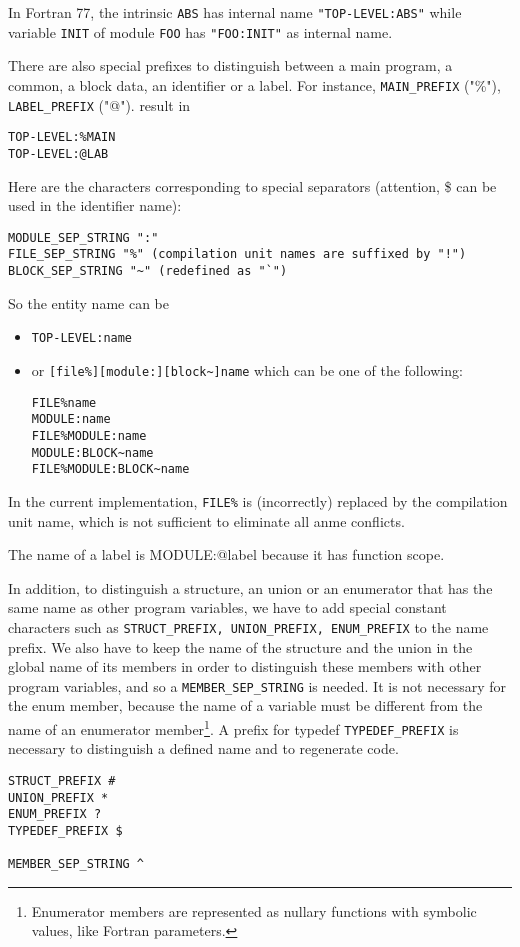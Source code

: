 \documentclass[a4paper]{report}
\begin{document}
In Fortran 77, the intrinsic \verb/ABS/ has internal name
\verb/"TOP-LEVEL:ABS"/ while variable \verb/INIT/ of module \verb/FOO/
has \verb/"FOO:INIT"/ as internal name.

There are also special prefixes to distinguish between a main program,
a common, a block data, an identifier or a label. For instance,
\verb/MAIN_PREFIX/ ("\%"), \verb/LABEL_PREFIX/ ("@"). result in
\begin{verbatim}
TOP-LEVEL:%MAIN
TOP-LEVEL:@LAB
\end{verbatim}

Here are the characters corresponding to special separators (attention, \$
can be used in the identifier name): 
\begin{verbatim}
MODULE_SEP_STRING ":"
FILE_SEP_STRING "%" (compilation unit names are suffixed by "!")
BLOCK_SEP_STRING "~" (redefined as "`")
\end{verbatim}  

So the entity name can be 
\begin{itemize}
\item 
\verb/TOP-LEVEL:name/
\item or 
\verb/[file%][module:][block~]name/ which can be one of the following: 
\begin{verbatim}
FILE%name
MODULE:name
FILE%MODULE:name
MODULE:BLOCK~name
FILE%MODULE:BLOCK~name
\end{verbatim}  
\end{itemize} 
In the current implementation, \verb/FILE%/ is (incorrectly) replaced
 by the compilation unit name, which is not sufficient to eliminate
 all anme conflicts.

The name of a label is MODULE:@label because it has function scope. 

In addition, to distinguish a structure, an union or an enumerator
that has the same name as other program variables, we have to add
special constant characters such as
\verb/STRUCT_PREFIX, UNION_PREFIX, ENUM_PREFIX/ to the name prefix. We
also have to keep the name of the structure and the union in the
global name of its members in order to distinguish these members with
other program variables, and so a \verb/MEMBER_SEP_STRING/ is needed.
It is not necessary for the enum member, because the name of a
variable must be different from the name of an enumerator
member\footnote{Enumerator members are represented as nullary
  functions with symbolic values, like Fortran parameters.}.  A prefix
for typedef \verb/TYPEDEF_PREFIX/ is necessary to distinguish a
defined name and to regenerate code.
\begin{verbatim}
STRUCT_PREFIX #
UNION_PREFIX *
ENUM_PREFIX ?
TYPEDEF_PREFIX $

MEMBER_SEP_STRING ^
\end{verbatim}
\end{document}
